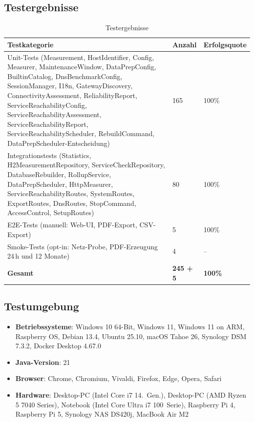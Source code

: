 \subsection{Testergebnisse}
\begin{table}[H]
\centering
\small
\begin{tabular}{|p{8.5cm}|l|l|}
\hline
\textbf{Testkategorie} & \textbf{Anzahl} & \textbf{Erfolgsquote} \\
\hline
Unit-Tests (Measurement, HostIdentifier, Config, Measurer, MaintenanceWindow, DataPrepConfig, BuiltinCatalog, DnsBenchmarkConfig, SessionManager, I18n, GatewayDiscovery, ConnectivityAssessment, ReliabilityReport, ServiceReachabilityConfig, ServiceReachabilityAssessment, ServiceReachabilityReport, ServiceReachabilityScheduler, RebuildCommand, DataPrepScheduler-Entscheidung) & 165 & 100\% \\
\hline
Integrationstests (Statistics, H2MeasurementRepository, ServiceCheckRepository, DatabaseRebuilder, RollupService, DataPrepScheduler, HttpMeasurer, ServiceReachabilityRoutes, SystemRoutes, ExportRoutes, DnsRoutes, StopCommand, AccessControl, SetupRoutes) & 80 & 100\% \\
\hline
E2E-Tests (manuell: Web-UI, PDF-Export, CSV-Export) & 5 & 100\% \\
\hline
Smoke-Tests (opt-in: Netz-Probe, PDF-Erzeugung 24\,h und 12 Monate) & 4 & -- \\
\hline
\textbf{Gesamt} & \textbf{245 + 5} & \textbf{100\%} \\
\hline
\end{tabular}
\caption{Testergebnisse}
\label{tab:test}
\end{table}

\subsection{Testumgebung}
\begin{itemize}
    \item \textbf{Betriebssysteme}: Windows 10 64-Bit, Windows 11, Windows 11 on ARM,
      Raspberry OS, Debian 13.4, Ubuntu 25.10, macOS Tahoe 26, Synology DSM 7.3.2,
      Docker Desktop 4.67.0
    \item \textbf{Java-Version}: 21
    \item \textbf{Browser}: Chrome, Chromium, Vivaldi, Firefox, Edge, Opera, Safari
    \item \textbf{Hardware}: Desktop-PC (Intel Core i7 14.~Gen.), Desktop-PC
      (AMD Ryzen 5 7040 Series), Notebook (Intel Core Ultra i7 100~Serie),
      Raspberry Pi 4, Raspberry Pi 5, Synology NAS DS420j, MacBook Air M2
\end{itemize}

